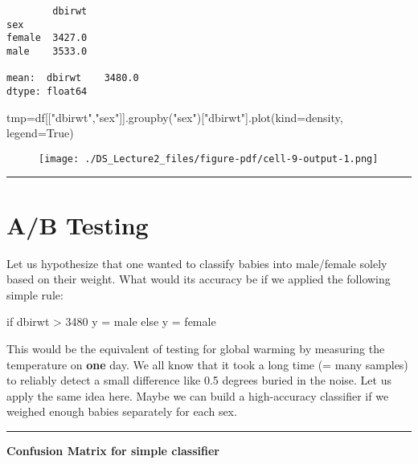 \documentclass[
  letterpaper,
  DIV=11,
  numbers=noendperiod]{scrreprt}
\newenvironment{Shaded}{\begin{snugshade}}{\end{snugshade}}
\newcommand{\NormalTok}[1]{\textcolor[rgb]{0.00,0.23,0.31}{#1}}
\newcommand{\OperatorTok}[1]{\textcolor[rgb]{0.37,0.37,0.37}{#1}}
\newcommand{\StringTok}[1]{\textcolor[rgb]{0.13,0.47,0.30}{#1}}
\newcommand{\VariableTok}[1]{\textcolor[rgb]{0.07,0.07,0.07}{#1}}
\begin{document}
\begin{verbatim}
        dbirwt
sex           
female  3427.0
male    3533.0 

mean:  dbirwt    3480.0
dtype: float64
\end{verbatim}

\begin{Shaded}
\begin{Highlighting}[]
\NormalTok{tmp}\OperatorTok{=}\NormalTok{df[[}\StringTok{"dbirwt"}\NormalTok{,}\StringTok{"sex"}\NormalTok{]].groupby(}\StringTok{"sex"}\NormalTok{)[}\StringTok{"dbirwt"}\NormalTok{].plot(kind}\OperatorTok{=}\StringTok{\textquotesingle{}density\textquotesingle{}}\NormalTok{, legend}\OperatorTok{=}\VariableTok{True}\NormalTok{)}
\end{Highlighting}
\end{Shaded}

\begin{figure}[H]

{\centering \texttt{[image: ./DS\_Lecture2\_files/figure-pdf/cell-9-output-1.png]}

}

\end{figure}

\begin{center}\rule{0.5\linewidth}{0.5pt}\end{center}

\hypertarget{ab-testing}{%
\section{A/B Testing}\label{ab-testing}}

Let us hypothesize that one wanted to classify babies into male/female
solely based on their weight. What would its accuracy be if we applied
the following simple rule:

if dbirwt \textgreater{} 3480 y = male else y = female

This would be the equivalent of testing for global warming by measuring
the temperature on \textbf{one} day. We all know that it took a long
time (= many samples) to reliably detect a small difference like 0.5
degrees buried in the noise. Let us apply the same idea here. Maybe we
can build a high-accuracy classifier if we weighed enough babies
separately for each sex.

\begin{center}\rule{0.5\linewidth}{0.5pt}\end{center}

\textbf{Confusion Matrix for simple classifier}
\end{document}

